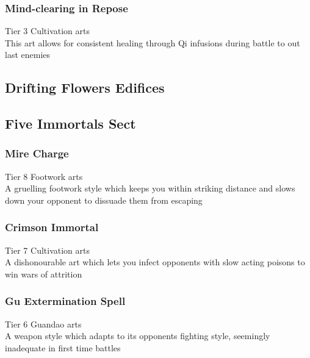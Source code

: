 \subsubsection{Mind-clearing in Repose}
Tier 3 Cultivation arts\\
This art allows for consistent healing through Qi infusions during battle to out last enemies

\subsection{Drifting Flowers Edifices} %
\subsubsection{}

\subsubsection{}

\subsubsection{}

\subsection{Five Immortals Sect}
\subsubsection{Mire Charge}
Tier 8 Footwork arts\\
A gruelling footwork style which keeps you within striking distance and slows down your opponent to dissuade them from escaping

\subsubsection{Crimson Immortal}
Tier 7 Cultivation arts\\
A dishonourable art which lets you infect opponents with slow acting poisons to win wars of attrition

\subsubsection{Gu Extermination Spell}
Tier 6 Guandao arts\\
A weapon style which adapts to its opponents fighting style, seemingly inadequate in first time battles

